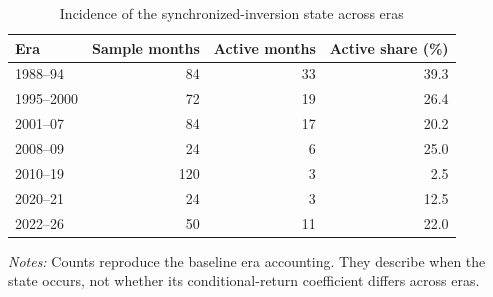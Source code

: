 \begin{table}[H]
\centering
\caption{Incidence of the synchronized-inversion state across eras}
\label{tab:state-incidence}
\small
\begin{tabular}{lrrr}
\toprule
Era & Sample months & Active months & Active share (\%) \\
\midrule
1988--94 & 84 & 33 & 39.3 \\
1995--2000 & 72 & 19 & 26.4 \\
2001--07 & 84 & 17 & 20.2 \\
2008--09 & 24 & 6 & 25.0 \\
2010--19 & 120 & 3 & 2.5 \\
2020--21 & 24 & 3 & 12.5 \\
2022--26 & 50 & 11 & 22.0 \\
\bottomrule
\end{tabular}

\begin{minipage}{0.94\textwidth}
\footnotesize\emph{Notes:} Counts reproduce the baseline era accounting. They describe when the state occurs, not whether its conditional-return coefficient differs across eras.
\end{minipage}
\end{table}
